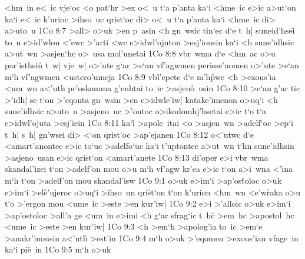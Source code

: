<hm~in
e<~ic
vje`oc
<o
pat`hr
>ex
o<~u
t`a
p'anta
ka`i
<hme~ic
e>ic
a>ut`on
ka`i
e<~ic
k'urioc
>ihso~uc
qrist`oc
di>
o<~u
t`a
p'anta
ka`i
<hme~ic
di>
a>uto~u\bibvsend
\vs 1Co 8:7
>all>
o>uk
>en
p~asin
<h
gn~wsic
tin`ec
d`e
t~h|
suneid'hsei\r{}
to~u
e>id'wlou
<'ewc
>'arti
<wc
e>idwl'ojuton
>esj'iousin
ka`i
<h
sune'idhsic
a>ut~wn
>asjen`hc
o>~usa
mol'unetai\bibvsend
\vs 1Co 8:8
vbr~wma
d`e
<hm~ac
o>u
par'isthsin\r{}
t~w|
vje~w|
o>'ute
g`ar
>e`an
vf'agwmen
perisse'uomen
o>'ute
>e`an
m`h
vf'agwmen
<ustero'umeja\bibvsend
\vs 1Co 8:9
vbl'epete
d`e
m'h\r{p}wc
<h
>exous'ia
<um~wn
a<'uth
pr'oskomma
g'enhtai
to~ic
>asjen\r{o}~usin\bibvsend
{}
\vs 1Co 8:10
>e`an
g'ar
tic
>'idh|
se
t`on
>'eqonta
gn~wsin
>en
e>idwle'iw|
katake'imenon
o>uq`i
<h
sune'idhsic
a>uto~u
>asjeno~uc
>'ontoc
o>ikodomhj'hsetai
e>ic
t`o
t`a
e>idwl'ojuta
>esj'iein\bibvsend
\vs 1Co 8:11
ka`i\r{}
>apole~itai
<o
>asjen~wn
>adelf`oc
>ep`i
t~h|
s~h|
gn'wsei
di>
<`on
qrist`oc
>ap'ejanen\bibvsend
\vs 1Co 8:12
o<'utwc
d`e
<amart'anontec
e>ic
to`uc
>adelfo`uc
ka`i
t'uptontec
a>ut~wn
t`hn
sune'idhsin
>asjeno~usan
e>ic
qrist`on
<amart'anete\bibvsend
\vs 1Co 8:13
di'oper
e>i
vbr~wma
skandal'izei
t`on
>adelf'on
mou
o>u
m`h
vf'agw
kr'ea
e>ic
t`on
a>i~wna
<'ina
m`h
t`on
>adelf'on
mou
skandal'isw\bibvsend
\vs 1Co 9:1
o>uk
e>im`i
>ap'os\r{t}oloc
o>uk
e>im`i
>el\r{e}'ujeroc
o>uq`i
>ihso~un
qri\r{s}\-t`on
t`on
k'urion
<hm~wn
<e'w\r{r}aka
o>u
t`o
>'ergon
mou
<ume~ic
>este
>en
kur'iw|\bibvsend
\vs 1Co 9:2
e>i
>'alloic
o>uk
e>im`i
>ap'ostoloc
>all'a
ge
<um~in
e>imi
<h
g`ar
sfrag`ic
t~hc\r{}
>em~hc
>apostol~hc
<ume~ic
>este
>en
kur'iw|\bibvsend
\vs 1Co 9:3
<h
>em`h
>apolog'ia
to~ic
>em`e
>anakr'inousin
a<'uth\r{}
>est'in\bibvsend
\vs 1Co 9:4
m`h
o>uk
>'eqomen
>exous'ian
vfage~in
ka`i
pi\r{e}~in\bibvsend
{}
\vs 1Co 9:5
m`h
o>uk
